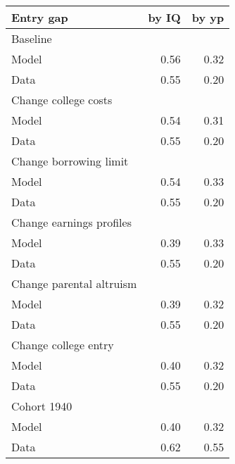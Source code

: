 \begin{tabular}{lrr}
\hline
Entry gap & by IQ  & by yp  \\ 
\hline
Baseline &   &   \\ 
Model & 0.56  & 0.32  \\ 
Data & 0.55  & 0.20  \\ 
Change college costs &   &   \\ 
Model & 0.54  & 0.31  \\ 
Data & 0.55  & 0.20  \\ 
Change borrowing limit &   &   \\ 
Model & 0.54  & 0.33  \\ 
Data & 0.55  & 0.20  \\ 
Change earnings profiles &   &   \\ 
Model & 0.39  & 0.33  \\ 
Data & 0.55  & 0.20  \\ 
Change parental altruism &   &   \\ 
Model & 0.39  & 0.32  \\ 
Data & 0.55  & 0.20  \\ 
Change college entry &   &   \\ 
Model & 0.40  & 0.32  \\ 
Data & 0.55  & 0.20  \\ 
Cohort 1940 &   &   \\ 
Model & 0.40  & 0.32  \\ 
Data & 0.62  & 0.55  \\ 
\hline
\end{tabular}%
